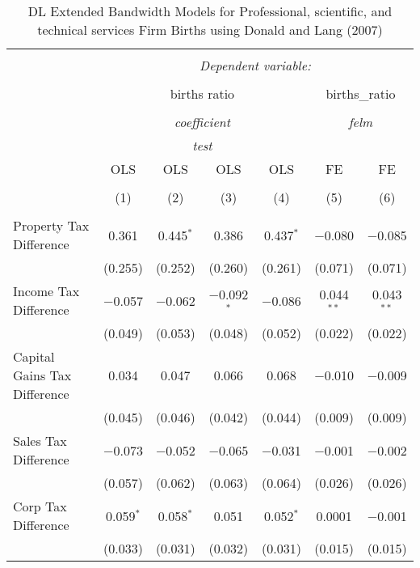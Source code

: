 
\begin{table}[!htbp] \centering 
  \caption{DL Extended Bandwidth Models for  Professional, scientific, and technical services Firm Births using Donald and Lang (2007)} 
  \label{} 
\begin{tabular}{@{\extracolsep{5pt}}lcccccc} 
\\[-1.8ex]\hline 
\hline \\[-1.8ex] 
 & \multicolumn{6}{c}{\textit{Dependent variable:}} \\ 
\cline{2-7} 
\\[-1.8ex] & \multicolumn{4}{c}{births ratio} & \multicolumn{2}{c}{births\_ratio} \\ 
\\[-1.8ex] & \multicolumn{4}{c}{\textit{coefficient}} & \multicolumn{2}{c}{\textit{felm}} \\ 
 & \multicolumn{4}{c}{\textit{test}} & \multicolumn{2}{c}{\textit{}} \\ 
 & OLS & OLS & OLS & OLS & FE & FE \\ 
\\[-1.8ex] & (1) & (2) & (3) & (4) & (5) & (6)\\ 
\hline \\[-1.8ex] 
 Property Tax Difference & 0.361 & 0.445$^{*}$ & 0.386 & 0.437$^{*}$ & $-$0.080 & $-$0.085 \\ 
  & (0.255) & (0.252) & (0.260) & (0.261) & (0.071) & (0.071) \\ 
  Income Tax Difference & $-$0.057 & $-$0.062 & $-$0.092$^{*}$ & $-$0.086 & 0.044$^{**}$ & 0.043$^{**}$ \\ 
  & (0.049) & (0.053) & (0.048) & (0.052) & (0.022) & (0.022) \\ 
  Capital Gains Tax Difference & 0.034 & 0.047 & 0.066 & 0.068 & $-$0.010 & $-$0.009 \\ 
  & (0.045) & (0.046) & (0.042) & (0.044) & (0.009) & (0.009) \\ 
  Sales Tax Difference & $-$0.073 & $-$0.052 & $-$0.065 & $-$0.031 & $-$0.001 & $-$0.002 \\ 
  & (0.057) & (0.062) & (0.063) & (0.064) & (0.026) & (0.026) \\ 
  Corp Tax Difference & 0.059$^{*}$ & 0.058$^{*}$ & 0.051 & 0.052$^{*}$ & 0.0001 & $-$0.001 \\ 
  & (0.033) & (0.031) & (0.032) & (0.031) & (0.015) & (0.015) \\ 

\end{tabular}
\end{table}
